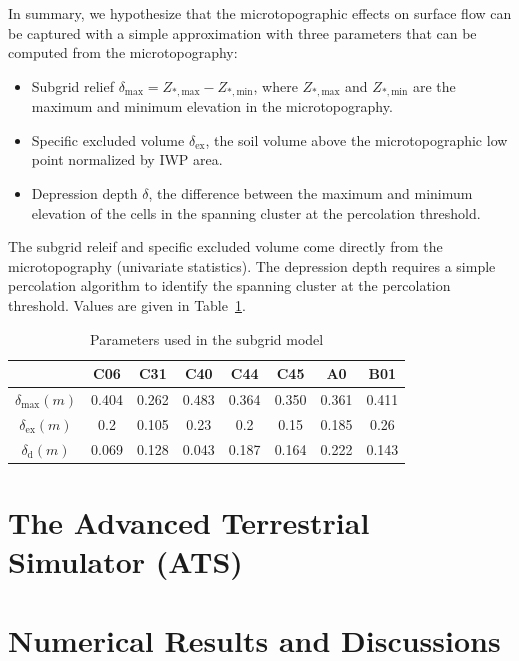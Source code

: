 \documentclass[review,11pt]{elsarticle}
\begin{document}
In summary, we hypothesize that the microtopographic effects on surface flow can be captured with a simple approximation with three parameters that can be computed from the microtopography:

\begin{itemize}
\item Subgrid relief $\delta_\text{max} = Z_{*,\text{max}} -   Z_{*,\text{min}}$, where  $Z_{*,\text{max}}$ and  $Z_{*,\text{min}}$ are the maximum and minimum elevation in the microtopography. 
\item Specific excluded volume $\delta_\text{ex}$, the soil volume above the microtopographic low point normalized by IWP area.
\item Depression depth $\delta$, the difference between the maximum and minimum elevation of the cells in the spanning cluster at the percolation threshold.
\end{itemize}
The subgrid releif and specific excluded volume come directly from the microtopography (univariate statistics). The depression depth requires a simple percolation algorithm to identify the spanning cluster at the percolation threshold. Values are given in Table~\ref{subgrid-para}.

\begin{center}
\begin{table}[htbp]
\caption{Parameters used in the subgrid model}\label{subgrid-para}
\begin{tabular}{| c |c|c|c|c|c|c|c|}
\hline
& C06 & C31 & C40 & C44 & C45 & A0 & B01 \\ \hline
 $\delta_\text{max}(m)$ & 0.404 & 0.262 & 0.483 & 0.364 & 0.350 & 0.361 & 0.411 \\ \hline
$\delta_\text{ex}(m)$ & 0.2 & 0.105 & 0.23 & 0.2 & 0.15 & 0.185 & 0.26\\ \hline
$ \delta_\text{d}(m)$ & 0.069 & 0.128 & 0.043 & 0.187 & 0.164 & 0.222 & 0.143 \\ \hline
\end{tabular}

\end{table}
\end{center}
\section{The Advanced Terrestrial Simulator (ATS)}\label{ATS}
\section{Numerical Results and Discussions}\label{numerical-tests}
\end{document}
